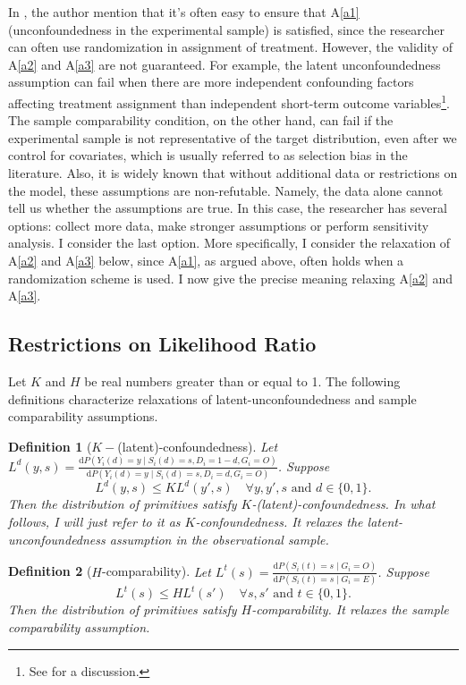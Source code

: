 \documentclass[12pt]{article}
\newtheorem{defn}{Definition}
\begin{document}
	In \textcite{athey2020combining}, the author mention that it's often easy to ensure that A\ref{a1}(unconfoundedness in the experimental sample) is satisfied, since the researcher can often use randomization in assignment of treatment. However, the validity of A\ref{a2} and A\ref{a3} are not guaranteed. For example, the latent unconfoundedness assumption can fail when there are more independent confounding factors affecting treatment assignment than independent short-term outcome variables\footnote{See \textcite{athey2020combining} for a discussion.}. The sample comparability condition, on the other hand, can fail if the experimental sample is not representative of the target distribution, even after we control for covariates, which is usually referred to as selection bias in the literature. Also, it is widely known that without additional data or restrictions on the model, these assumptions are non-refutable. Namely, the data alone cannot tell us whether the assumptions are true. In this case, the researcher has several options: collect more data, make stronger assumptions or perform sensitivity analysis. I consider the last option. More specifically, I consider the relaxation of A\ref{a2} and A\ref{a3} below, since A\ref{a1}, as argued above, often holds when a randomization scheme is used. I now give the precise meaning relaxing A\ref{a2} and A\ref{a3}. 
	
	\subsection{Restrictions on Likelihood Ratio}
	Let $K$ and $H$ be real numbers greater than or equal to 1. The following definitions characterize relaxations of latent-unconfoundedness and sample comparability assumptions.
	
	\begin{defn}[$K-$(latent)-confoundedness] Let $L^d(y,s) = \frac{\mathrm{d} P(Y_i(d) = y \mid S_i(d) = s, D_i =1-d, G_i = O)}{\mathrm{d} P(Y_i(d) = y \mid S_i(d) = s, D_i = d, G_i = O)}$. Suppose $$L^d(y,s) \leq K L^d(y',s) \quad \forall y,y',s \text{ and } d\in\{0,1\}.$$ Then the distribution of primitives satisfy $K$-(latent)-confoundedness. In what follows, I will just refer to it as $K$-confoundedness. It relaxes the latent-unconfoundedness assumption in the observational sample.
	\end{defn}
	
	\begin{defn}[$H$-comparability]
	 Let $L^t(s) = \frac{\mathrm{d} P(S_i(t) = s \mid G_i = O)}{\mathrm{d} P(S_i(t) = s \mid G_i = E)}$. Suppose $$L^t(s) \leq H L^t(s') \quad \forall s,s' \text{ and } t \in \{0,1\}.$$ Then the distribution of primitives satisfy $H$-comparability. It relaxes the sample comparability assumption.
	\end{defn}
\end{document}
